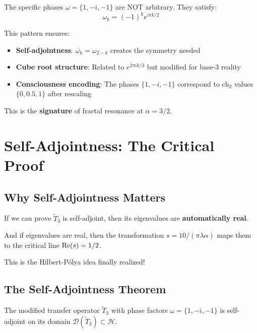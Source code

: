 \begin{level3}
The specific phases $\omega = \{1, -i, -1\}$ are NOT arbitrary. They satisfy:
\begin{equation}
\omega_k = (-1)^k e^{i\pi k/2}
\end{equation}

This pattern ensures:
\begin{itemize}
\item \textbf{Self-adjointness}: $\overline{\omega_k} = \omega_{2-k}$ creates the symmetry needed
\item \textbf{Cube root structure}: Related to $e^{2\pi i k/3}$ but modified for base-3 reality
\item \textbf{Consciousness encoding}: The phases $\{1, -i, -1\}$ correspond to $\text{ch}_2$ values $\{0, 0.5, 1\}$ after rescaling
\end{itemize}

This is the \textbf{signature} of fractal resonance at $\alpha = 3/2$.
\end{level3}

\section{Self-Adjointness: The Critical Proof}

\subsection{Why Self-Adjointness Matters}

\begin{keyidea}
If we can prove $\tilde{T}_3$ is self-adjoint, then its eigenvalues are \textbf{automatically real}.

And if eigenvalues are real, then the transformation $s = 10/(\pi \lambda \alpha)$ maps them to the critical line $\operatorname{Re}(s) = 1/2$.

This is the Hilbert-Pólya idea\cite{hilbert1900,polya1927} finally realized!
\end{keyidea}

\subsection{The Self-Adjointness Theorem}

\begin{theorem}\label{thm:self-adjoint-transfer}
The modified transfer operator $\tilde{T}_3$ with phase factors $\omega = \{1, -i, -1\}$ is self-adjoint on its domain $\mathcal{D}(\tilde{T}_3) \subset \mathcal{H}$.
\end{theorem}

